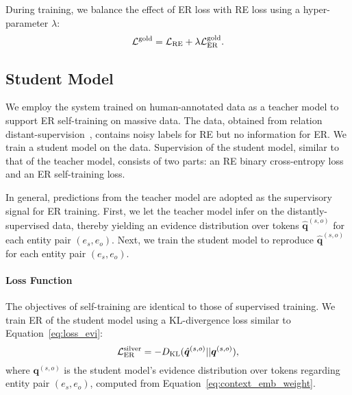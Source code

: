 \documentclass[11pt]{article}
\begin{document}
During training, we balance the effect of ER loss with RE loss using a hyper-parameter $\lambda$:
\begin{equation}
    \mathcal{L}^{\rm gold} = \mathcal{L}_{\mathrm{RE}} + \lambda\mathcal{L}_{\mathrm{ER}}^{\rm gold}.\label{eq:loss_gold}
\end{equation}

\subsection{Student Model}

We employ the system trained on human-annotated data as a teacher model to support ER self-training on massive data. 
The data, obtained from relation distant-supervision~\cite{mintz-etal-2009-distant}, contains noisy labels for RE but no information for ER.
We train a student model on the data.
Supervision of the student model, similar to that of the teacher model, consists of two parts:
an RE binary cross-entropy loss and an ER self-training loss.

In general, predictions from the teacher model are adopted as the supervisory signal for ER training.
First, we let the teacher model infer on the distantly-supervised data, thereby yielding an evidence distribution over tokens $\hat{\bm{q}}^{(s,o)}$ for each entity pair $(e_s,e_o)$.
Next, we train the student model to reproduce $\hat{\bm{q}}^{(s,o)}$ for each entity pair $(e_s,e_o)$.

\paragraph{Loss Function} The objectives of self-training are identical to those of supervised training.
We train ER of the student model using a KL-divergence loss similar to Equation~\ref{eq:loss_evi}:
\begin{equation}
    \mathcal{L}^{\rm silver}_{\mathrm{ER}} = -D_{\rm KL} (\hat{\bm{q}}^{(s,o)} || \bm{q}^{(s,o)}),
    \label{eq:loss_evi_silver}
\end{equation}
where $\bm{q}^{(s,o)}$ is the student model's evidence distribution over tokens regarding entity pair $(e_s,e_o)$, computed from Equation~\ref{eq:context_emb_weight}.
\end{document}
